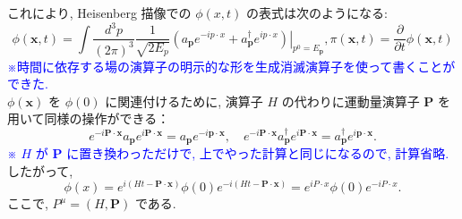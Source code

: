 \documentclass[a4paper,12pt]{article}
\begin{document}
これにより, Heisenberg 描像での $\phi(x, t)$ の表式は次のようになる:
\begin{equation*}
\phi(\mathbf{x}, t) = \int \frac{d^3 p}{(2\pi)^3} \frac{1}{\sqrt{2 E_p}} \left.\left( a_{\mathbf{p}} e^{-i p \cdot x} + a_{\mathbf{p}}^\dagger e^{i p \cdot x} \right)\right|_{p^0 = E_{\mathbf{p}}}, \pi(\mathbf{x}, t) = \dfrac{\partial}{\partial t} \phi(\mathbf{x}, t) \label{2.47}\tag{2.47}
\end{equation*}
\textcolor{blue}{※時間に依存する場の演算子の明示的な形を生成消滅演算子を使って書くことができた.}\\
$\phi(\mathbf{x})$ を $\phi(0)$ に関連付けるために, 演算子 $H$ の代わりに運動量演算子 $\mathbf{P}$ を用いて同様の操作ができる：
\begin{equation*}
e^{-i \mathbf{P} \cdot \mathbf{x}} a_{\mathbf{p}} e^{i \mathbf{P} \cdot \mathbf{x}} = a_{\mathbf{p}} e^{-i \mathbf{p} \cdot \mathbf{x}}, \quad
e^{-i \mathbf{P} \cdot \mathbf{x}} a_{\mathbf{p}}^\dagger e^{i \mathbf{P} \cdot \mathbf{x}} = a_{\mathbf{p}}^\dagger e^{i \mathbf{p} \cdot \mathbf{x}}. \tag{2.48}
\end{equation*}
\textcolor{blue}{※ $H$ が $\mathbf{P}$ に置き換わっただけで, 上でやった計算と同じになるので, 計算省略.}\\
したがって,
\begin{equation*}
\phi(x) = e^{i(Ht - \mathbf{P} \cdot \mathbf{x})} \phi(0) e^{-i(Ht - \mathbf{P} \cdot \mathbf{x})} = e^{i P \cdot x} \phi(0) e^{-i P \cdot x}. \tag{2.49}
\end{equation*}
ここで, $P^\mu = (H, \mathbf{P})$ である.\\
\end{document}
